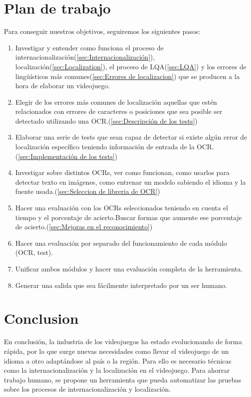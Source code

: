 \section{Plan de trabajo}
Para conseguir nuestros objetivos, seguiremos los siguientes pasos:
\begin{enumerate}
	\item Investigar y entender como funciona el proceso de internacionalización(\ref{sec:Internacionalización}), localización(\ref{sec:Localization}), el proceso de LQA(\ref{sec:LQA}) y los errores de lingüísticos más comunes(\ref{sec:Errores de localizacion}) que se producen a la hora de elaborar un videojuego. 
	\item Elegir de los errores más comunes de localización aquellas que estén relacionados con errores de caracteres o posiciones que sea posible ser detectado utilizando una OCR.(\ref{sec:Descripción de los tests})
	\item Elaborar una serie de tests que sean capaz de detectar si existe algún error de localización específico teniendo información de entrada de la OCR.(\ref{sec:Implementación de los tests})
	\item Investigar sobre distintos OCRs, ver como funcionan, como usarlos para detectar texto en imágenes, como entrenar un modelo sabiendo el idioma y la fuente usada.(\ref{sec:Seleccion de libreria de OCR})
	\item Hacer una evaluación con los OCRs seleccionados teniendo en cuenta el tiempo y el porcentaje de acierto.Buscar formas que aumente ese porcentaje de acierto.(\ref{sec:Mejoras en el reconocimiento})
	\item Hacer una evaluación por separado del funcionamiento de cada módulo (OCR, test).
	\item Unificar ambos módulos y hacer una evaluación completa de la herramienta.
	\item Generar una salida que sea fácilmente interpretado por un ser humano. 
	
\end{enumerate}
\section{Conclusion}
En conclusión, la industria de los videojuegos ha estado evolucionando de forma rápida, por lo que surge nuevas necesidades como llevar el videojuego de un idioma a otro adaptándose al país o la región. Para ello es necesario técnicas como la internacionalización y la localización en el videojuego. Para ahorrar trabajo humano, se propone un herramienta que pueda automatizar las pruebas sobre los procesos de internacionalización y localización.

